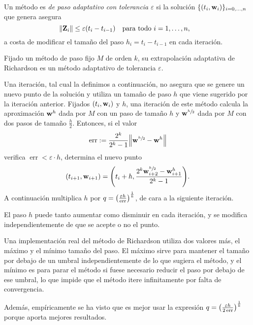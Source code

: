 \begin{definition}
    Un método es \emph{de paso adaptativo con tolerancia $\varepsilon$}
    si la solución $\{(t_i, \vb{w}_i)\}_{i = 0,\ldots,n}$ que genera asegura
    \begin{equation*}
        \norm{\ELT_i} \le \varepsilon (t_i - t_{i-1})
            \qq{para todo $i = 1,\ldots,n$,}
    \end{equation*}
    a costa de modificar el tamaño del paso $h_i = t_i - t_{i-1}$
    en cada iteración.
\end{definition}

\begin{method}
    Fijado un método de paso fijo $M$ de orden $k$,
    su extrapolación adaptativa de Richardson
    es un método adaptativo de tolerancia $\varepsilon$.

    Una iteración, tal cual la definimos a continuación,
    no asegura que se genere un nuevo punto de la solución y
    utiliza un tamaño de paso $h$ que viene sugerido por la iteración anterior.
    Fijados $(t_i, \vb{w}_i)$ y $h$,
    una iteración de este método
    calcula la aproximación $\vb{w}^h$ dada por $M$ con un paso de tamaño $h$
    y $\vb{w}^{\sfrac{h}{2}}$ dada por $M$ con dos pasos de tamaño $\frac{h}{2}$.
    Entonces, si el valor
    \begin{equation*}
        \operatorname{err} := \frac{2^k}{2^k-1}\norm{\vb{w}^{\sfrac{h}{2}} - \vb{w}^h}
    \end{equation*}
    verifica $\operatorname{err} < \varepsilon\cdot h$,
    determina el nuevo punto
    \begin{equation*}
        (t_{i+1}, \vb{w}_{i+1}) = \qty(
            t_i + h, \frac{2^k\vb{w}^{\sfrac{h}{2}}_{i+2} - \vb{w}^h_{i+1}}{2^k - 1}
        ).
    \end{equation*}
    A continuación multiplica $h$ por
    $q = \qty(\frac{\varepsilon h}{\operatorname{err}})^{\frac{1}{k}}$,
    de cara a la siguiente iteración.
\end{method}

\begin{remark}
    El paso $h$ puede tanto aumentar como disminuir en cada iteración,
    y se modifica independientemente de que se acepte o no el punto.
\end{remark}

\begin{remark}
    Una implementación real del método de Richardson
    utiliza dos valores más,
    el máximo y el mínimo tamaño del paso.
    El máximo sirve para mantener el tamaño por debajo de un umbral
    independientemente de lo que sugiera el método,
    y el mínimo es para parar el método si fuese necesario reducir el paso
    por debajo de ese umbral,
    lo que impide que el método itere infinitamente por falta de convergencia.

    Además, empíricamente se ha visto que es mejor usar la expresión
    $q = \qty(\frac{\varepsilon h}{2\operatorname{err}})^{\frac{1}{k}}$
    porque aporta mejores resultados.
\end{remark}
    
